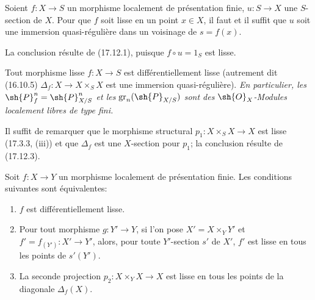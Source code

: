 \begin{corollary}[17.12.3]
\label{IV.17.12.3}
Soient $f:X\to S$ un morphisme localement de présentation finie, $u:S\to X$ une $S$-section de $X$. Pour que $f$ soit lisse en un point $x\in X$, il faut et il suffit que $u$ soit une immersion quasi-régulière dans un voisinage de $s=f(x)$.
\end{corollary}

La conclusion résulte de (17.12.1), puisque $f\circ u=1_S$ est lisse.

\begin{proposition}[17.12.4]
\label{IV.17.12.4}
Tout morphisme lisse $f:X\to S$ est différentiellement lisse (autrement dit (16.10.5) $\Delta_f:X\to X\times_SX$ est une immersion quasi-régulière). \emph{En particulier, les $\sh{P}_f^n=\sh{P}_{X/S}^n$ et les $\operatorname{gr}_n(\sh{P}_{X/S})$ sont des $\sh{O}_X$-Modules localement libres de type fini.}
\end{proposition}

Il suffit de remarquer que le morphisme structural $p_1:X\times_SX\to X$ est lisse (17.3.3, (iii)) et que $\Delta_f$ est une $X$-section pour $p_1$; la conclusion résulte de (17.12.3).

\begin{proposition}[17.12.5]
\label{IV.17.12.5}
Soit $f:X\to Y$ un morphisme localement de présentation finie. Les conditions suivantes sont équivalentes:
\begin{enumerate}
  \item[a)] $f$ est différentiellement lisse.
  \item[b)] Pour tout morphisme $g:Y'\to Y$, si l'on pose $X'=X\times_Y Y'$ et $f'=f_{(Y')}:X'\to Y'$, alors, pour toute $Y'$-section $s'$ de $X'$, $f'$ est lisse en tous les points de $s'(Y')$.
  \item[c)] La seconde projection $p_2:X\times_YX\to X$ est lisse en tous les points de la diagonale $\Delta_f(X)$.
\end{enumerate}
\end{proposition}

